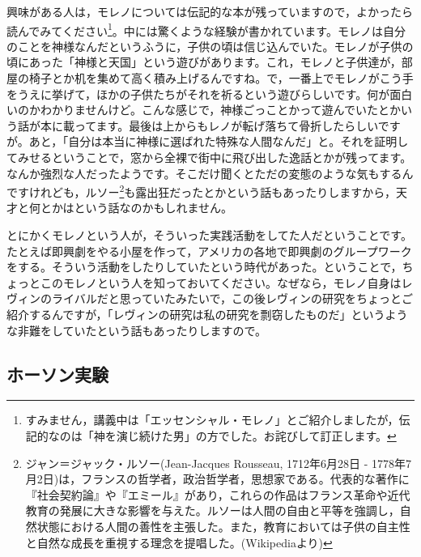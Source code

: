 \documentclass{ltjsbook}
\begin{document}
興味がある人は，モレノについては伝記的な本が残っていますので，よかったら読んでみてください\footnote{すみません，講義中は「エッセンシャル・モレノ」\parencite{essentialMoreno}とご紹介しましたが，伝記的なのは「神を演じ続けた男」\parencite{GodOfMoreno}の方でした。お詫びして訂正します。}。中には驚くような経験が書かれています。モレノは自分のことを神様なんだというふうに，子供の頃は信じ込んでいた。モレノが子供の頃にあった「神様と天国」という遊びがあります。これ，モレノと子供達が，部屋の椅子とか机を集めて高く積み上げるんですね。で，一番上でモレノがこう手をうえに挙げて，ほかの子供たちがそれを祈るという遊びらしいです。何が面白いのかわかりませんけど。こんな感じで，神様ごっことかって遊んでいたとかいう話が本に載ってます。最後は上からもレノが転げ落ちて骨折したらしいですが。あと，「自分は本当に神様に選ばれた特殊な人間なんだ」と。それを証明してみせるということで，窓から全裸で街中に飛び出した逸話とかが残ってます。なんか強烈な人だったようです。そこだけ聞くとただの変態のような気もするんですけれども，ルソー\footnote{ジャン＝ジャック・ルソー(Jean-Jacques Rousseau, 1712年6月28日 - 1778年7月2日)は，フランスの哲学者，政治哲学者，思想家である。代表的な著作に『社会契約論』や『エミール』があり，これらの作品はフランス革命や近代教育の発展に大きな影響を与えた。ルソーは人間の自由と平等を強調し，自然状態における人間の善性を主張した。また，教育においては子供の自主性と自然な成長を重視する理念を提唱した。(Wikipediaより)}も露出狂だったとかという話もあったりしますから，天才と何とかはという話なのかもしれません。

とにかくモレノという人が，そういった実践活動をしてた人だということです。たとえば即興劇をやる小屋を作って，アメリカの各地で即興劇のグループワークをする。そういう活動をしたりしていたという時代があった。ということで，ちょっとこのモレノという人を知っておいてください。なぜなら，モレノ自身はレヴィンのライバルだと思っていたみたいで，この後レヴィンの研究をちょっとご紹介するんですが，「レヴィンの研究は私の研究を剽窃したものだ」というような非難をしていたという話もあったりしますので。

\subsection{ホーソン実験}
\end{document}

